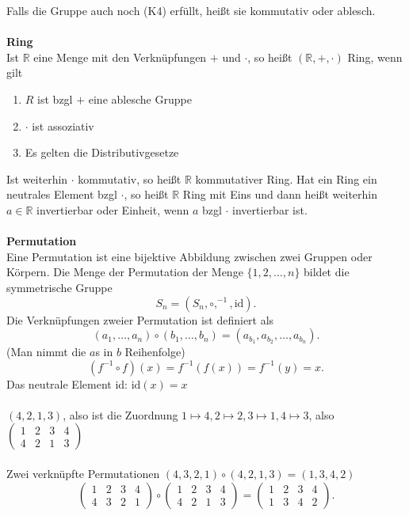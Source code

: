 \documentclass[a4paper,12pt]{article}
\begin{document}
Falls die Gruppe auch noch (K4) erfüllt, heißt sie kommutativ oder ablesch.
\\\hfill\\\textbf{Ring}\\ 
Ist $\mathbb{R}$ eine Menge mit den Verknüpfungen $+$ und $\cdot $, so heißt $\left(\mathbb{R},+,\cdot \right)$ Ring, wenn gilt
\begin{enumerate}[label=(\alph*)]
        \item ${R}$ ist bzgl $+$ eine ablesche Gruppe
        \item $\cdot $ ist assoziativ
        \item Es gelten die Distributivgesetze
\end{enumerate}
Ist weiterhin $\cdot $ kommutativ, so heißt $\mathbb{R}$ kommutativer Ring. Hat ein Ring ein neutrales Element bzgl $\cdot $, so heißt $\mathbb{R}$ Ring mit Eins und dann heißt weiterhin $a \in \mathbb{R}$ invertierbar oder Einheit, wenn $a$ bzgl $\cdot $ invertierbar ist.
\\\hfill\\\textbf{Permutation}\\
Eine Permutation ist eine bijektive Abbildung zwischen zwei Gruppen oder Körpern. Die Menge der Permutation der Menge $\{1,2,\hdots,n\}$ bildet die symmetrische Gruppe
\[
        S_{n}=\left( S_n,\circ,^{-1},\text{id}\right)
.\]
Die Verknüpfungen zweier Permutation ist definiert als
\[ 
        \left( a_1,\hdots,a_n\right) \circ\left( b_1,\hdots,b_n\right) =\left( a_{b_{1}},a_{b_{2}},\hdots,a_{b_{n}}\right) 
.\] 
(Man nimmt die $a$s in $b$ Reihenfolge)
\[ 
        \left( f^{-1}\circ f\right) \left( x\right) =f^{-1}\left( f\left( x\right) \right) =f^{-1}\left( y\right) =x
.\] 
Das neutrale Element id: $\text{id}\left( x\right) =x$\\\\ 
$\left( 4,2,1,3\right) $, also ist die Zuordnung $1\mapsto 4,2\mapsto 2,3\mapsto 1,4\mapsto 3 $, also $\left(
        \begin{matrix}
                1&2&3&4\\
                4&2&1&3
        \end{matrix}
\right)
$\\\\
Zwei verknüpfte Permutationen $\left( 4,3,2,1\right) \circ\left( 4,2,1,3\right) =\left( 1,3,4,2\right) $ 
\[ 
\left(
        \begin{matrix}
                1&2&3&4\\
                4&3&2&1
        \end{matrix}
\right)
\circ
\left( 
        \begin{matrix}
                1&2&3&4\\
                4&2&1&3
        \end{matrix}
\right) 
=
\left( 
        \begin{matrix}
                1&2&3&4\\
                1&3&4&2
        \end{matrix}
\right) 
.\] 
\end{document}
